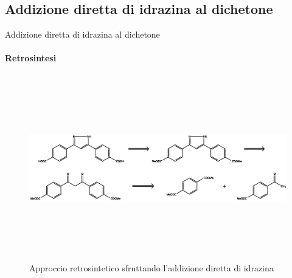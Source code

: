 \documentclass{beamer}
\begin{document}
\subsection{Addizione diretta di idrazina al dichetone}
\begin{frame}{Addizione diretta di idrazina al dichetone}
	\framesubtitle{Retrosintesi}
	\begin{figure}[h]
		\centering
		\includegraphics[width=14cm,height=8cm,keepaspectratio]{../Structures/pyr-retro.eps}
		\caption{Approccio retrosintetico sfruttando l'addizione diretta di idrazina}
	\end{figure}
\end{frame}
\end{document}
